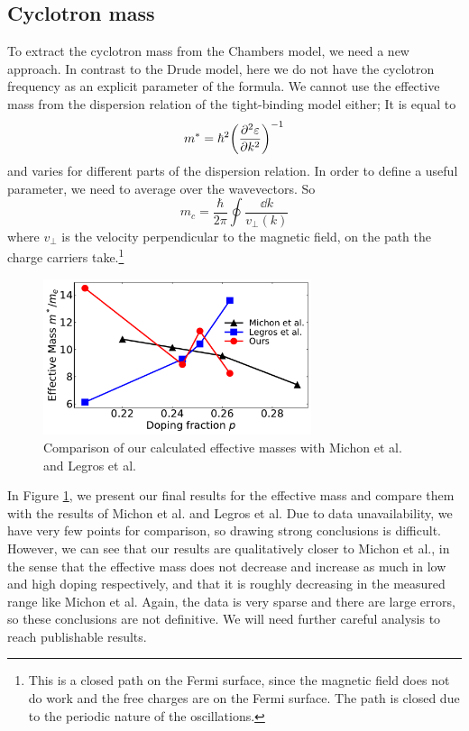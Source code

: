 \subsection{Cyclotron mass}
To extract the cyclotron mass from the Chambers model, we need a new approach. In contrast to the
Drude model, here we do not have the cyclotron frequency as an explicit parameter of the formula.
We cannot use the effective mass from the dispersion relation of the tight-binding model either;
It is equal to
\begin{equation}
    m^* = \hbar^2\qty(\pdv[2]{\varepsilon}{k})^{-1}
\end{equation}
and varies for different parts of the dispersion relation. In order to define a useful parameter,
we need to average over the wavevectors. So
\begin{equation}
    m_c = \frac{\hbar}{2\pi}\oint\frac{\dd{k}}{v_\perp (k)}
\end{equation}
where $v_\perp$ is the velocity perpendicular to the magnetic field, on the path the charge
carriers take.\footnote{This is a closed path on the Fermi surface, since the magnetic field does
not do work and the free charges are on the Fermi surface. The path is closed due to the periodic
nature of the oscillations.}

\begin{figure}
    \centering
    \includegraphics[width=0.7\textwidth]{figures/effective_mass}
    \caption{Comparison of our calculated effective masses with Michon et al. and Legros et al.}
    \label{fig:effective_mass}
\end{figure}

In Figure \ref{fig:effective_mass}, we present our final results for the effective mass and compare
them with the results of Michon et al. and Legros et al. Due to data unavailability, we have very
few points for comparison, so drawing strong conclusions is difficult. However, we can see that
our results are qualitatively closer to Michon et al., in the sense that the effective mass does
not decrease and increase as much in low and high doping respectively, and that it is roughly
decreasing in the measured range like Michon et al. Again, the data is very sparse and there are
large errors, so these conclusions are not definitive. We will need further careful analysis to
reach publishable results.
